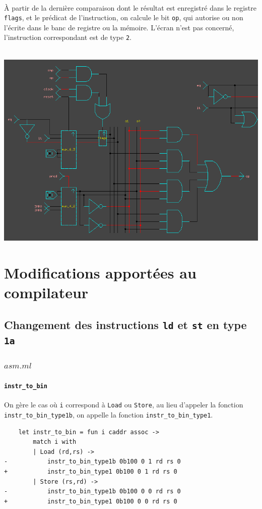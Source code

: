 \documentclass[11pt, a4paper, twoside, titlepage]{article}
\begin{document}
\paragraph{}
À partir de la dernière comparaison dont le résultat est enregistré dans le registre \texttt{flags}, et le prédicat de l'instruction, on calcule le bit \texttt{op}, qui autorise ou non l'écrite dans le banc de registre ou la mémoire. L'écran n'est pas concerné, l'instruction correspondant est de type \texttt{2}.\\
\\
\centerline{\includegraphics[width=.8 \textwidth]{mgr_cmp}}

\section{Modifications apportées au compilateur}

\subsection{Changement des instructions \texttt{ld} et \texttt{st} en type \texttt{1a}}

\subsubsection{$asm.ml$}
\paragraph{\texttt{instr\_to\_bin}}
On gère le cas où \texttt{i} correspond à \texttt{Load} ou \texttt{Store}, au lieu d'appeler la fonction \texttt{instr\_to\_bin\_type1b}, on appelle la fonction \texttt{instr\_to\_bin\_type1}.
\begin{lstlisting}
	let instr_to_bin = fun i caddr assoc ->
		match i with
		| Load (rd,rs) ->
-			instr_to_bin_type1b 0b100 0 1 rd rs 0
+			instr_to_bin_type1 0b100 0 1 rd rs 0
		| Store (rs,rd) ->
-			instr_to_bin_type1b 0b100 0 0 rd rs 0
+			instr_to_bin_type1 0b100 0 0 rd rs 0
\end{lstlisting}
\end{document}
